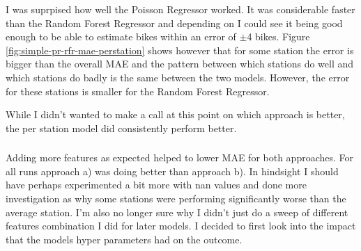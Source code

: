 \documentclass[a4paper]{article}
\begin{document}
    I was suprpised how well the Poisson Regressor worked. It was considerable faster than the Random Forest Regressor
    and depending on I could see it being good enough to be able to estimate bikes within an error of $\pm$4 bikes.
    Figure \ref{fig:simple-pr-rfr-mae-perstation} shows however that for some station the error is bigger
    than the overall MAE and the pattern between which stations do well and which stations do badly is the same between the
    two models. However, the error for these stations is smaller for the Random Forest Regressor.

    While I didn't wanted to make a call at this point on which approach is better, the per station model did consistently
    perform better.

    \subsubsection*{}
    Adding more features as expected helped to lower MAE for both approaches. For all runs approach a) was
    doing better than approach b). In hindsight I should have perhaps experimented a bit more with nan values and
    done more investigation as why some stations were performing significantly worse than the average station. I'm also
    no longer sure why I didn't just do a sweep of different features combination I did for later models.
    I decided to first look into the impact that the models hyper parameters had on the outcome.

    
    
\end{document}
